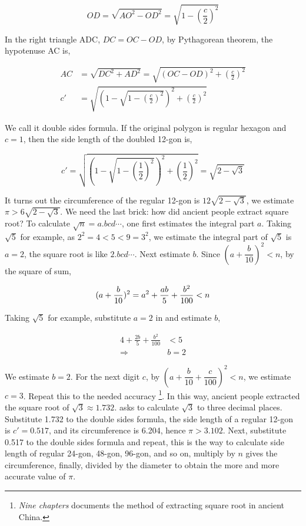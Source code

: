 \documentclass[b5paper]{article}
\begin{document}
\[
OD = \sqrt{AO^2 - OD^2} = \sqrt{1 - \left(\frac{c}{2}\right)^2}
\]

In the right triangle ADC, $DC = OC - OD$, by Pythagorean theorem, the hypotenuse AC is,

\begin{align}
AC &= \sqrt{DC^2 + AD^2} = \sqrt{(OC - OD)^2 + \left(\frac{c}{2}\right)^2}  \\
c' &= \sqrt{\left(1 - \sqrt{1 - \left(\frac{c}{2}\right)^2}\right)^2 + \left(\frac{c}{2}\right)^2}
\label{eq:double-edges}
\end{align}

We call it double sides formula. If the original polygon is regular hexagon and $c = 1$, then the side length of the doubled 12-gon is,

\[
c' = \sqrt{\left(1 - \sqrt{1 - \left(\frac{1}{2}\right)^2}\right)^2 + \left(\frac{1}{2}\right)^2} = \sqrt{2 - \sqrt{3}}
\]

It turns out the circumference of the regular 12-gon is $12\sqrt{2 - \sqrt{3}}$, we estimate $\pi > 6\sqrt{2 - \sqrt{3}}$. We need the last brick: how did ancient people extract square root? To calculate $\sqrt{n} = a.bcd\dotsm$, one first estimates the integral part $a$. Taking $\sqrt{5}$ for example, as $2^2 = 4 < 5 < 9 = 3^2$, we estimate the integral part of $\sqrt{5}$ is $a = 2$, the square root is like $2.bcd\dotsm$. Next estimate $b$. Since $(a + \dfrac{b}{10})^2 < n$, by the square of sum,

\[
(a + \frac{b}{10})^2 = a^2 + \frac{ab}{5} + \frac{b^2}{100}  < n \\
\]

Taking $\sqrt{5}$ for example, substitute $a = 2$ in and estimate $b$,

\begin{align*}
4 + \frac{2b}{5} + \frac{b^2}{100} &< 5 \\
 \Rightarrow & b = 2
\end{align*}

We estimate $b = 2$. For the next digit $c$, by $(a + \dfrac{b}{10} + \dfrac{c}{100})^2 < n$, we estimate $c = 3$. Repeat this to the needed accuracy \footnote{\emph{Nine chapters} documents the method of extracting square root in ancient China.}. In this way, ancient people extracted the square root of $\sqrt{3} \approx 1.732$.  asks to calculate $\sqrt{3}$ to three decimal places. Substitute 1.732 to the double sides formula, the side length of a regular 12-gon is $c' = 0.517$, and its circumference is 6.204, hence $\pi > 3.102$. Next, substitute 0.517 to the double sides formula and repeat, this is the way to calculate side length of regular 24-gon, 48-gon, 96-gon, and so on, multiply by $n$ gives the circumference, finally, divided by the diameter to obtain the more and more accurate value of $\pi$.
\end{document}
